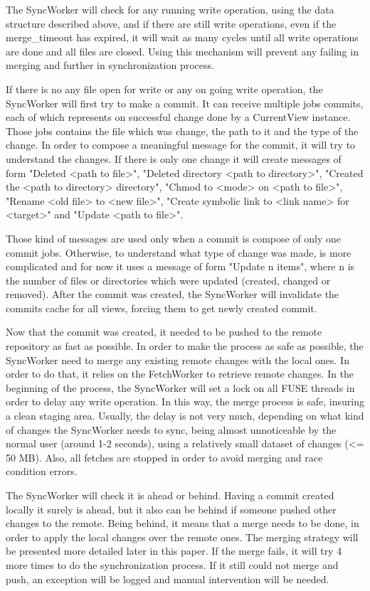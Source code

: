 The SyncWorker will check for any running write operation, using the data structure described above, and if there are still write operations, even if the merge\_timeout has expired, it will wait as many cycles until all write operations are done and all files are closed. Using this mechanism will prevent any failing in merging  and further in synchronization process.

If there is no any file open for write or any on going write operation, the SyncWorker will first try to make a commit. It can receive multiple jobs commits, each of which represents on successful change done by a CurrentView instance. Those jobs contains the file which was change, the path to it and the type of the change. In order to compose a meaningful message for the commit, it will try to understand the changes. If there is only one change it will create messages of form "Deleted <path to file>", "Deleted directory <path to directory>", "Created the <path to directory> directory", "Chmod to <mode> on <path to file>", "Rename <old file> to <new file>", "Create symbolic link to <link name> for <target>" and "Update <path to file>".

Those kind of messages are used only when a commit is compose of only one commit jobs. Otherwise, to understand what type of change was made, is more complicated and for now it uses a message of form "Update n items", where n is the number of files or directories which were updated (created, changed or removed).
After the commit was created, the SyncWorker will invalidate the commits cache for all views, forcing them to get newly created commit. 

Now that the commit was created, it needed to be pushed to the remote repository as fast as possible. In order to make the process as safe as possible, the SyncWorker need to merge any existing remote changes with the local ones. In order to do that, it relies on the FetchWorker to retrieve remote changes. In the beginning of the process, the SyncWorker will set a lock on all FUSE threads in order to delay any write operation. In this way, the merge process is safe, insuring a clean staging area. Usually, the delay is not very much, depending on what kind of changes the SyncWorker needs to sync, being almost unnoticeable by the normal user (around 1-2 seconds), using a relatively small dataset of changes (<= 50 MB). Also, all fetches are stopped in order to avoid merging and race condition errors.

The SyncWorker will check it is ahead or behind. Having a commit created locally it surely is ahead, but it also can be behind if someone pushed other changes to the remote. Being behind, it means that a merge needs to be done, in order to apply the local changes over the remote ones. The merging strategy will be presented more detailed later in this paper. If the merge fails, it will try 4 more times to do the synchronization process. If it still could not merge and push, an exception will be logged and manual intervention will be needed.

